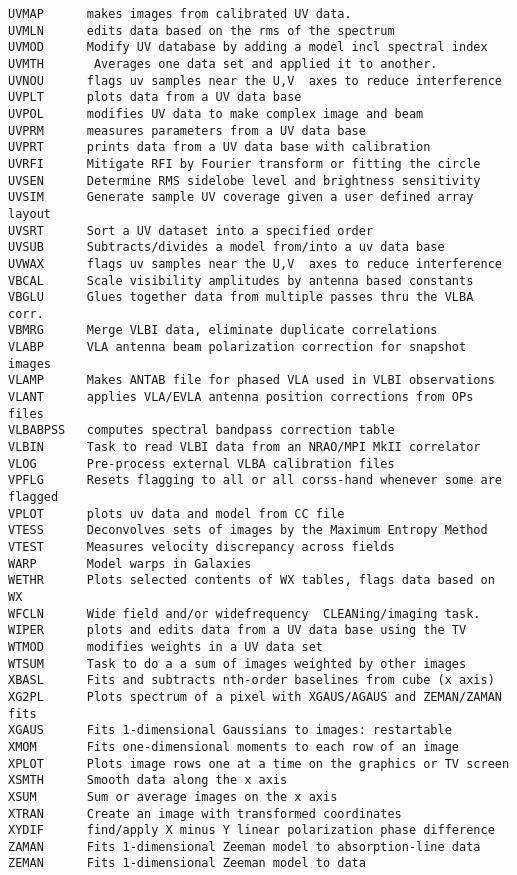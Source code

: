 \begin{verbatim}
UVMAP      makes images from calibrated UV data.
UVMLN      edits data based on the rms of the spectrum
UVMOD      Modify UV database by adding a model incl spectral index
UVMTH       Averages one data set and applied it to another.
UVNOU      flags uv samples near the U,V  axes to reduce interference
UVPLT      plots data from a UV data base
UVPOL      modifies UV data to make complex image and beam
UVPRM      measures parameters from a UV data base
UVPRT      prints data from a UV data base with calibration
UVRFI      Mitigate RFI by Fourier transform or fitting the circle
UVSEN      Determine RMS sidelobe level and brightness sensitivity
UVSIM      Generate sample UV coverage given a user defined array layout
UVSRT      Sort a UV dataset into a specified order
UVSUB      Subtracts/divides a model from/into a uv data base
UVWAX      flags uv samples near the U,V  axes to reduce interference
VBCAL      Scale visibility amplitudes by antenna based constants
VBGLU      Glues together data from multiple passes thru the VLBA corr.
VBMRG      Merge VLBI data, eliminate duplicate correlations
VLABP      VLA antenna beam polarization correction for snapshot images
VLAMP      Makes ANTAB file for phased VLA used in VLBI observations
VLANT      applies VLA/EVLA antenna position corrections from OPs files
VLBABPSS   computes spectral bandpass correction table
VLBIN      Task to read VLBI data from an NRAO/MPI MkII correlator
VLOG       Pre-process external VLBA calibration files
VPFLG      Resets flagging to all or all corss-hand whenever some are flagged
VPLOT      plots uv data and model from CC file
VTESS      Deconvolves sets of images by the Maximum Entropy Method
VTEST      Measures velocity discrepancy across fields
WARP       Model warps in Galaxies
WETHR      Plots selected contents of WX tables, flags data based on WX
WFCLN      Wide field and/or widefrequency  CLEANing/imaging task.
WIPER      plots and edits data from a UV data base using the TV
WTMOD      modifies weights in a UV data set
WTSUM      Task to do a a sum of images weighted by other images
XBASL      Fits and subtracts nth-order baselines from cube (x axis)
XG2PL      Plots spectrum of a pixel with XGAUS/AGAUS and ZEMAN/ZAMAN fits
XGAUS      Fits 1-dimensional Gaussians to images: restartable
XMOM       Fits one-dimensional moments to each row of an image
XPLOT      Plots image rows one at a time on the graphics or TV screen
XSMTH      Smooth data along the x axis
XSUM       Sum or average images on the x axis
XTRAN      Create an image with transformed coordinates
XYDIF      find/apply X minus Y linear polarization phase difference
ZAMAN      Fits 1-dimensional Zeeman model to absorption-line data
ZEMAN      Fits 1-dimensional Zeeman model to data
\end{verbatim}\eve

